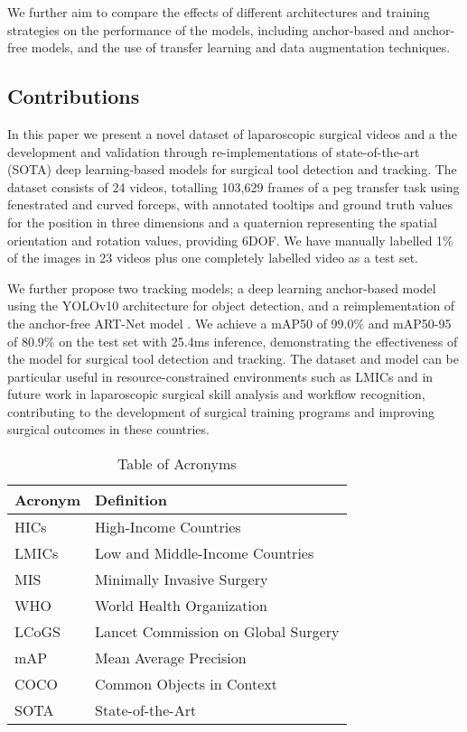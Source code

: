 We further aim to compare the effects of different architectures and training strategies on the performance of the models, including anchor-based and anchor-free models, and the use of transfer learning and data augmentation techniques.

\subsection{Contributions}

In this paper we present a novel dataset of laparoscopic surgical videos and a the development and validation through re-implementations of state-of-the-art (SOTA) deep learning-based models for surgical tool detection and tracking. The dataset consists of 24 videos, totalling 103,629 frames of a peg transfer task using fenestrated and curved forceps, with annotated tooltips and ground truth values for the position in three dimensions and a quaternion representing the spatial orientation and rotation values, providing 6DOF. We have manually labelled 1\% of the images in 23 videos plus one completely labelled video as a test set.

We further propose two tracking models; a deep learning anchor-based model using the YOLOv10 architecture for object detection, and a reimplementation of the anchor-free ART-Net model \cite{hasan_detection_2021}. We achieve a mAP50 of 99.0\% and mAP50-95 of 80.9\% on the test set with 25.4ms inference, demonstrating the effectiveness of the model for surgical tool detection and tracking. The dataset and model can be particular useful in resource-constrained environments such as LMICs and in future work in laparoscopic surgical skill analysis and workflow recognition, contributing to the development of surgical training programs and improving surgical outcomes in these countries.

\begin{table}[h]
    \centering
    \caption{Table of Acronyms}
    \begin{tabular}{ll}
      \toprule
      \textbf{Acronym} & \textbf{Definition} \\
      \midrule
      HICs & High-Income Countries \\
      LMICs & Low and Middle-Income Countries \\
      MIS & Minimally Invasive Surgery \\
      WHO & World Health Organization \\
      LCoGS & Lancet Commission on Global Surgery \\
      mAP & Mean Average Precision \\
      COCO & Common Objects in Context \\
      SOTA & State-of-the-Art \\
      \bottomrule
    \end{tabular}
    \label{tab:acronyms}
  \end{table}